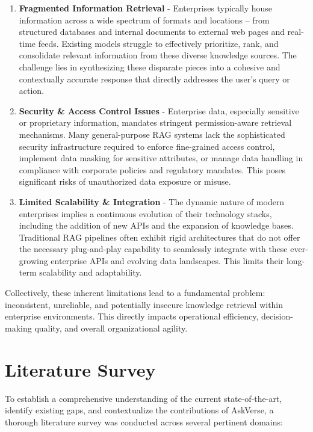 \documentclass[default]{sn-jnl}%
\begin{document}
\begin{enumerate}
    \item \textbf{Fragmented Information Retrieval} - Enterprises typically house information across a wide spectrum of formats and locations – from structured databases and internal documents to external web pages and real-time feeds. Existing models struggle to effectively prioritize, rank, and consolidate relevant information from these diverse knowledge sources. The challenge lies in synthesizing these disparate pieces into a cohesive and contextually accurate response that directly addresses the user's query or action.
    \item \textbf{Security \& Access Control Issues} - Enterprise data, especially sensitive or proprietary information, mandates stringent permission-aware retrieval mechanisms. Many general-purpose RAG systems lack the sophisticated security infrastructure required to enforce fine-grained access control, implement data masking for sensitive attributes, or manage data handling in compliance with corporate policies and regulatory mandates. This poses significant risks of unauthorized data exposure or misuse.
    \item \textbf{Limited Scalability \& Integration} - The dynamic nature of modern enterprises implies a continuous evolution of their technology stacks, including the addition of new APIs and the expansion of knowledge bases. Traditional RAG pipelines often exhibit rigid architectures that do not offer the necessary plug-and-play capability to seamlessly integrate with these ever-growing enterprise APIs and evolving data landscapes. This limits their long-term scalability and adaptability.
\end{enumerate}

Collectively, these inherent limitations lead to a fundamental problem: inconsistent, unreliable, and potentially insecure knowledge retrieval within enterprise environments. This directly impacts operational efficiency, decision-making quality, and overall organizational agility.

\section*{Literature Survey}
To establish a comprehensive understanding of the current state-of-the-art, identify existing gaps, and contextualize the contributions of AskVerse, a thorough literature survey was conducted across several pertinent domains:
\end{document}
